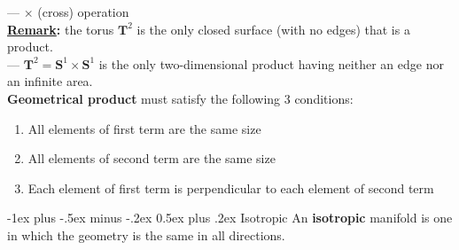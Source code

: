 \documentclass[10pt,landscape]{article}
\makeatletter
\renewcommand{\section}{\@startsection{section}{1}{0mm}%
                                {-1ex plus -.5ex minus -.2ex}%
                                {0.5ex plus .2ex}%
                                {\normalfont\large\bfseries}}
\makeatother
\begin{document}
\begin{multicols}{3}
--- $\times$ (cross) operation\\
{\bf \underline{Remark}:} the torus $\mathbf{T}^2$ is the only closed surface
(with no edges) that is a product.\\
--- $\mathbf{T}^2 = \mathbf{S}^1 \times \mathbf{S}^1$ is the only
two-dimensional product having neither an edge nor an infinite area.\\
{\bf Geometrical product} must satisfy the following 3 conditions:
\begin{enumerate}
\item All elements of first term are the same size
\item All elements of second term are the same size
\item Each element of first term is perpendicular to each element of second term
\end{enumerate}


\section{Isotropic}
An {\bf isotropic} manifold is one in which the geometry is the same in all
directions.






\clearpage


\end{multicols}
\end{document}
